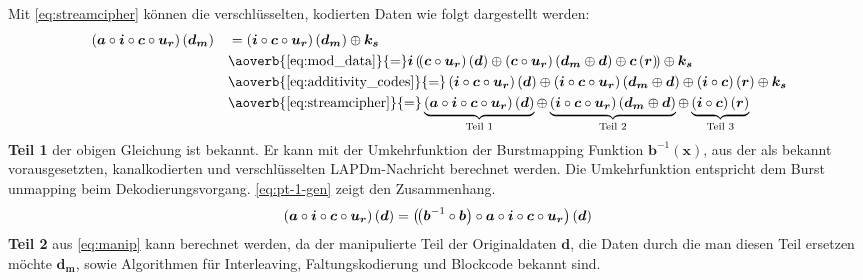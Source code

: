 Mit \autoref{eq:streamcipher} können die verschlüsselten, kodierten Daten wie folgt dargestellt werden:\noindent
\begin{equation}\label{eq:manip}
\begin{aligned}
& \left( \boldsymbol{a} \circ \boldsymbol{i} \circ \boldsymbol{c} \circ \boldsymbol{u_r} \right) \left(\boldsymbol{d_m}\right) & &= \left( \boldsymbol{i} \circ \boldsymbol{c} \circ \boldsymbol{u_r} \right) \left(\boldsymbol{d_m}\right) \oplus \boldsymbol{k_s} \\
&                   & &\aoverb{\ref{eq:mod_data}}{=} \boldsymbol{i}\left(( \boldsymbol{c} \circ \boldsymbol{u_r}\right)\left(\boldsymbol{d}\right) \oplus \left( \boldsymbol{c} \circ \boldsymbol{u_r}\right) \left(\boldsymbol{d_m} \oplus \boldsymbol{d}\right) \oplus \boldsymbol{c}\left(\boldsymbol{r}\right)) \oplus \boldsymbol{k_s} \\
&                   & &\aoverb{\ref{eq:additivity_codes}}{=} \left( \boldsymbol{i} \circ \boldsymbol{c} \circ \boldsymbol{u_r}\right)\left(\boldsymbol{d}\right) \oplus \left( \boldsymbol{i} \circ \boldsymbol{c} \circ \boldsymbol{u_r}\right) \left(\boldsymbol{d_m} \oplus \boldsymbol{d}\right) \oplus \left( \boldsymbol{i} \circ \boldsymbol{c}\right)\left(\boldsymbol{r}\right) \oplus \boldsymbol{k_s} \\
&                   & &\aoverb{\ref{eq:streamcipher}}{=} \underbrace{\left(\boldsymbol{a} \circ \boldsymbol{i} \circ \boldsymbol{c} \circ \boldsymbol{u_r}\right)\left(\boldsymbol{d}\right)}_\text{Teil 1} \oplus \underbrace{\left(\boldsymbol{i} \circ \boldsymbol{c} \circ \boldsymbol{u_r}\right)\left(\boldsymbol{d_m} \oplus \boldsymbol{d}\right)}_\text{Teil 2} \oplus \underbrace{\left(\boldsymbol{i} \circ \boldsymbol{c}\right)\left(\boldsymbol{r}\right)}_\text{Teil 3}
\end{aligned}
\end{equation}\noindent
\textbf{Teil 1} der obigen Gleichung ist bekannt. Er kann mit der Umkehrfunktion der Burstmapping Funktion $\boldsymbol{b}^{-1}(\boldsymbol{x})$, aus der als bekannt vorausgesetzten, kanalkodierten und verschlüsselten \ac{LAPDm}-Nachricht berechnet werden. Die Umkehrfunktion entspricht dem Burst unmapping beim Dekodierungsvorgang. \autoref{eq:pt-1-gen} zeigt den Zusammenhang. 
\begin{equation}\label{eq:pt-1-gen}
\begin{aligned}
\left( \boldsymbol{a} \circ \boldsymbol{i} \circ \boldsymbol{c} \circ \boldsymbol{u_r}\right)\left(\boldsymbol{d}\right) = \left(( \boldsymbol{b}^{-1} \circ \boldsymbol{b} \right) \circ \boldsymbol{a} \circ \boldsymbol{i} \circ \boldsymbol{c} \circ \boldsymbol{u_r}\right)\left(\boldsymbol{d}\right)
\end{aligned}
\end{equation}\noindent
\textbf{Teil 2} aus \autoref{eq:manip} kann berechnet werden, da der manipulierte Teil der Originaldaten $\boldsymbol{d}$, die Daten durch die man diesen Teil ersetzen möchte $\boldsymbol{d_m}$, sowie Algorithmen für Interleaving, Faltungskodierung und Blockcode bekannt sind.

